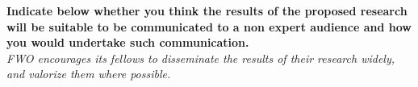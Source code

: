 \documentclass[11pt,dvipsnames,usenames,a4paper]{article}
\begin{document}



\renewcommand\refname{\normalsize Enumerate the bibliographical references that are relevant for your research proposal.}


\vspace{5mm}

\textbf{Indicate below whether you think the results of the proposed research will be suitable to be communicated to a non expert audience and how you would undertake such communication.}\\
\textit{FWO encourages its fellows to disseminate the results of their research widely, and valorize them where possible.}
\end{document}

